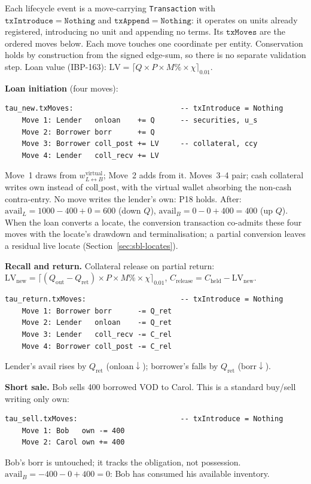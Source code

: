 Each lifecycle event is a move-carrying \texttt{Transaction} with $\mathtt{txIntroduce}=\texttt{Nothing}$ and $\mathtt{txAppend}=\texttt{Nothing}$: it operates on units already registered, introducing no unit and appending no terms. Its $\mathtt{txMoves}$ are the ordered moves below. Each move touches one coordinate per entity. Conservation holds by construction from the signed edge-sum, so there is no separate validation step. Loan value (IBP-163): $\mathrm{LV} = \lceil Q\times P\times M\%\times\chi \rceil_{0.01}$.

\noindent\textbf{Loan initiation} (four moves):
\begin{lstlisting}
tau_new.txMoves:                         -- txIntroduce = Nothing
    Move 1: Lender   onloan    += Q      -- securities, u_s
    Move 2: Borrower borr      += Q
    Move 3: Borrower coll_post += LV     -- collateral, ccy
    Move 4: Lender   coll_recv += LV
\end{lstlisting}
Move~1 draws from $w^{\mathrm{virtual}}_{L\leftrightarrow B}$; Move~2 adds from it. Moves~3--4 pair; cash collateral writes $\mathrm{own}$ instead of $\mathrm{coll\_post}$, with the virtual wallet absorbing the non-cash contra-entry. No move writes the lender's $\mathrm{own}$: P18 holds. After: $\mathrm{avail}_L = 1000-400+0 = 600$ (down $Q$), $\mathrm{avail}_B = 0-0+400 = 400$ (up $Q$). When the loan converts a locate, the conversion transaction co-admits these four moves with the locate's drawdown and terminalisation; a partial conversion leaves a residual live locate (Section~\ref{sec:sbl-locates}).

\noindent\textbf{Recall and return.} Collateral release on partial return: $\mathrm{LV}_{\mathrm{new}} = \lceil (Q_{\mathrm{out}}-Q_{\mathrm{ret}})\times P\times M\%\times\chi\rceil_{0.01}$, $C_{\mathrm{release}} = C_{\mathrm{held}}-\mathrm{LV}_{\mathrm{new}}$.
\begin{lstlisting}
tau_return.txMoves:                      -- txIntroduce = Nothing
    Move 1: Borrower borr      -= Q_ret
    Move 2: Lender   onloan    -= Q_ret
    Move 3: Lender   coll_recv -= C_rel
    Move 4: Borrower coll_post -= C_rel
\end{lstlisting}
Lender's $\mathrm{avail}$ rises by $Q_{\mathrm{ret}}$ ($\mathrm{onloan}\downarrow$); borrower's falls by $Q_{\mathrm{ret}}$ ($\mathrm{borr}\downarrow$).

\noindent\textbf{Short sale.} Bob sells 400 borrowed VOD to Carol. This is a standard buy/sell writing only $\mathrm{own}$:
\begin{lstlisting}
tau_sell.txMoves:                        -- txIntroduce = Nothing
    Move 1: Bob   own -= 400
    Move 2: Carol own += 400
\end{lstlisting}
Bob's $\mathrm{borr}$ is untouched; it tracks the obligation, not possession. $\mathrm{avail}_B = -400-0+400 = 0$: Bob has consumed his available inventory.

